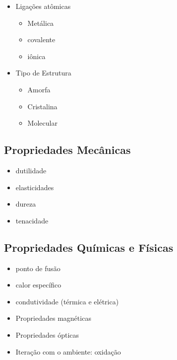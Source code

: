 \begin{itemize}
		
	\setlength{\parskip}{0pt}
	\setlength{\itemsep}{0pt plus 1pt}
	
	\item Ligações atômicas
	
	\begin{itemize}
			
		\setlength{\parskip}{0pt}
		\setlength{\itemsep}{0pt plus 1pt}
		
		\item Metálica
		\item covalente
		\item iônica
	\end{itemize}

	\item Tipo de Estrutura
	\begin{itemize}
			
		\setlength{\parskip}{0pt}
		\setlength{\itemsep}{0pt plus 1pt}
		
		\item Amorfa
		\item Cristalina
		\item Molecular
	\end{itemize}
\end{itemize}


\subsection*{Propriedades Mecânicas}
\begin{itemize}
		
	\setlength{\parskip}{0pt}
	\setlength{\itemsep}{0pt plus 1pt}
	
	\item dutilidade
	\item elasticidades
	\item dureza
	\item tenacidade
\end{itemize}

\subsection*{Propriedades Químicas e Físicas}
\begin{itemize}
		
	\setlength{\parskip}{0pt}
	\setlength{\itemsep}{0pt plus 1pt}
	
\item	ponto de fusão
\item	calor específico
\item	condutividade (térmica e elétrica)
\item 	Propriedades magnéticas
\item 	Propriedades ópticas
\item 	Iteração com o ambiente: oxidação 
\end{itemize}

